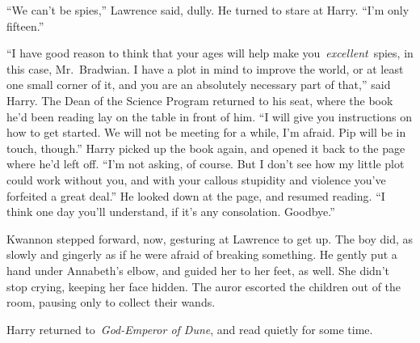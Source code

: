 ``We can't be spies,'' Lawrence said, dully. He turned to stare at
Harry. ``I'm only fifteen.''

``I have good reason to think that your ages will help make
you~\emph{excellent}~spies, in this case, Mr.~Bradwian. I have a plot in
mind to improve the world, or at least one small corner of it, and you
are an absolutely necessary part of that,'' said Harry. The Dean of the
Science Program returned to his seat, where the book he'd been reading
lay on the table in front of him. ``I will give you instructions on how
to get started. We will not be meeting for a while, I'm afraid. Pip will
be in touch, though.'' Harry picked up the book again, and opened it
back to the page where he'd left off. ``I'm not asking, of course. But I
don't see how my little plot could work without you, and with your
callous stupidity and violence you've forfeited a great deal.'' He
looked down at the page, and resumed reading. ``I think one day you'll
understand, if it's any consolation. Goodbye.''

Kwannon stepped forward, now, gesturing at Lawrence to get up. The boy
did, as slowly and gingerly as if he were afraid of breaking something.
He gently put a hand under Annabeth's elbow, and guided her to her feet,
as well. She didn't stop crying, keeping her face hidden. The auror
escorted the children out of the room, pausing only to collect their
wands.

Harry returned to~\emph{God-Emperor of Dune}, and read quietly for some
time.
